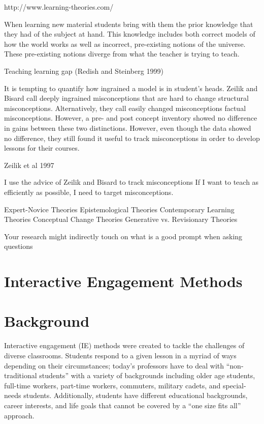 http://www.learning-theories.com/

When learning new material students bring with them the prior knowledge that they had of the subject at hand. This knowledge includes both correct models of how the world works as well as incorrect, pre-existing notions of the universe. These pre-existing notions diverge from what the teacher is trying to teach.

Teaching learning gap (Redish and Steinberg 1999)

It is tempting to quantify how ingrained a model is in student's heads. Zeilik and Bisard call deeply ingrained misconceptions that are hard to change structural misconceptions. Alternatively, they call easily changed misconceptions factual misconceptions\cite{zeilik2000}. However, a pre- and post concept inventory showed no difference in gains between these two distinctions. However, even though the data showed no difference, they still found it useful to track misconceptions in order to develop lessons for their courses.

Zeilik et al 1997

I use the advice of Zeilik and  Bisard to track misconceptions\cite{zeilik2000}
If I want to teach as efficiently as possible, I need to target misconceptions.

Expert-Novice Theories
Epistemological Theories
Contemporary Learning Theories
Conceptual Change Theories
Generative vs. Revisionary Theories

Your research might indirectly touch on what is a good prompt when asking questions

\section{Interactive Engagement Methods}

\section{Background}

Interactive engagement (IE) methods were created to tackle the challenges of diverse classrooms. Students respond to a given lesson in a myriad of ways depending on their circumstances; today's professors have to deal with ``non-traditional students'' with a variety of backgrounds including older age students, full-time workers, part-time workers, commuters, military cadets, and special-needs students. Additionally, students have different educational backgrounds, career interests, and life goals that cannot be covered by a ``one size fits all'' approach\cite{novak1999}.

